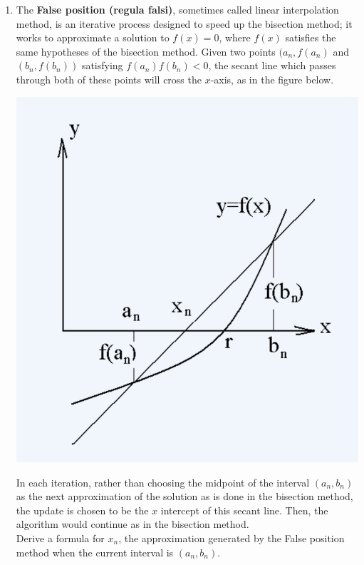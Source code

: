 \documentclass[12pt]{article}
\newif\ifans
\begin{document}
\begin{enumerate}
\item The  {\bf False position (regula falsi)}, sometimes called linear interpolation method, is an iterative process designed to speed up the bisection method; it works to approximate a solution to $f(x)=0$, where $f(x)$ satisfies the same hypotheses of the bisection method.  Given two points $(a_n,f(a_n)$ and $(b_n,f(b_n))$ satisfying $f(a_n)f(b_n)<0$, the secant line which passes through both of these points will cross the $x$-axis, as in the figure below.
\begin{center}
\includegraphics[scale=0.5]{LinearInterp.png}
\end{center}
In each iteration, rather than choosing the midpoint of the interval $(a_n,b_n)$ as the next approximation of the solution as is done in the bisection method, the update is chosen to be the $x$ intercept of this secant line.  Then, the algorithm would continue as in the bisection method.\\

Derive a formula for $x_n$, the approximation generated by the False position method when the current interval is $(a_n,b_n)$.

\ifans{\fbox{$x_{n} = a_n - \frac{f(a_n)(b_n-a_n)}{f(b_n)-f(a_n)}$}} \fi

\end{enumerate}
\end{document}
